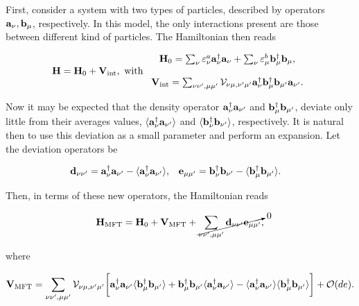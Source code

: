 \documentclass{homework}
\begin{document}
First, consider a system with two types of particles, described by operators ${\bf a}_\nu, {\bf b}_{\mu}$, respectively. In this model, the only interactions present are those between different kind of particles. The Hamiltonian then reads

\begin{equation}
    {\bf H} = {\bf H}_0 + {\bf V}_{\textnormal{int}}, \textnormal{ with } \begin{array}{c}
         {\bf H}_0 = \sum_{\nu} \varepsilon_{\nu}^a {\bf a}_\nu^\dagger {\bf a}_\nu + \sum_{\nu} \varepsilon_{\mu}^b{\bf b}_\mu^\dagger {\bf b}_\mu,  \\
         \\
         {\bf V}_{\textnormal{int}}  = \sum_{\nu\nu', \mu\mu'} {\mathcal V}_{\nu\mu, \nu'\mu'} {\bf a}^\dagger_{\nu} {\bf b}_{\mu}^\dagger {\bf b}_{\mu'} {\bf a}_{\nu'}.
    \end{array}
\end{equation}

Now it may be expected that the density operator ${\bf a}_{\nu}^\dagger {\bf a}_{\nu'}$ and ${\bf b}_{\mu}^\dagger {\bf b}_{\mu'}$, deviate only little from their averages values, $ \langle {\bf a}_{\nu}^\dagger {\bf a}_{\nu'} \rangle$ and  $ \langle {\bf b}_{\nu}^\dagger {\bf b}_{\nu'} \rangle$, respectively. It is natural then to use this deviation as a small parameter and perform an expansion. Let the deviation operators be 

\begin{align}
    {\bf d}_{\nu \nu'} &= {\bf a}_{\nu}^\dagger {\bf a}_{\nu'} - \langle {\bf a}_{\nu}^\dagger {\bf a}_{\nu'} \rangle, & {\bf e}_{\mu \mu'} &= {\bf b}_{\nu}^\dagger {\bf b}_{\nu'} - \langle {\bf b}_{\mu}^\dagger {\bf b}_{\mu'} \rangle.
\end{align}

Then, in terms of these new operators, the Hamiltonian reads

\begin{equation*}
    {\bf H}_{\textnormal{MFT}}  = {\bf H}_0 + {\bf V}_{\textnormal{MFT}} + \cancelto{0}{\sum_{\nu\nu', \mu\mu'} {\bf d}_{\nu \nu'} {\bf e}_{\mu \mu'}},
\end{equation*}

where 

\begin{align}
    {\bf V}_{\textnormal{MFT}} = \sum_{\nu\nu', \mu\mu'} {\mathcal V}_{\nu\mu, \nu'\mu'}\bigg[{\bf a}_{\nu}^\dagger {\bf a}_{\nu'} \langle {\bf b}_{\mu}^\dagger {\bf b}_{\mu'} \rangle + {\bf b}_{\mu}^\dagger {\bf b}_{\mu'} \langle {\bf a}_{\nu}^\dagger {\bf a}_{\nu'} \rangle - \langle {\bf a}_{\nu}^\dagger {\bf a}_{\nu'} \rangle \langle {\bf b}_{\mu}^\dagger {\bf b}_{\mu'} \rangle \bigg] + \mathcal{O}(d e).
\end{align}
\end{document}
